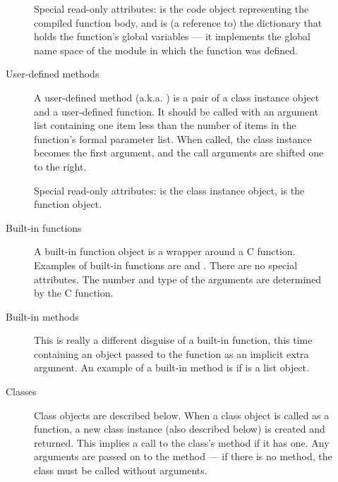 \begin{description}
\begin{description}
Special read-only attributes:  is the code object
representing the compiled function body, and  is (a
reference to) the dictionary that holds the function's global
variables --- it implements the global name space of the module in
which the function was defined.

\item[User-defined methods]
A user-defined method (a.k.a. ) is a pair of a
class instance object and a user-defined function.  It should be
called with an argument list containing one item less than the number
of items in the function's formal parameter list.  When called, the
class instance becomes the first argument, and the call arguments are
shifted one to the right.

Special read-only attributes:  is the class instance
object,  is the function object.

\item[Built-in functions]
A built-in function object is a wrapper around a C function.  Examples
of built-in functions are  and .  There
are no special attributes.  The number and type of the arguments are
determined by the C function.

\item[Built-in methods]
This is really a different disguise of a built-in function, this time
containing an object passed to the \C{} function as an implicit extra
argument.  An example of a built-in method is  if
 is a list object.

\item[Classes]
Class objects are described below.  When a class object is called as a
function, a new class instance (also described below) is created and
returned.  This implies a call to the class's  method
if it has one.  Any arguments are passed on to the 
method --- if there is no  method, the class must be called
without arguments.


\end{description}
\end{description}
